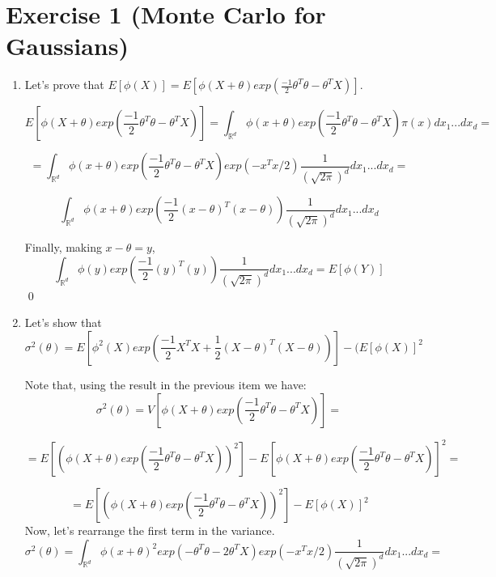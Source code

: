 \documentclass[12pt,letterpaper]{article}
\begin{document}

\section*{Exercise 1 (Monte Carlo for Gaussians)}
\begin{enumerate}[leftmargin=!,labelindent=5pt]
	\item Let's prove that $E[\phi(X)] = E[\phi(X+\theta)
	exp(\frac{-1}{2}\theta^T\theta - \theta^T X)]$.

	$$ E[\phi(X+\theta)exp(\frac{-1}{2}\theta^T\theta - \theta^T X)]
	= \int_{\mathbb{R}^d} \phi(x+\theta) exp(\frac{-1}{2}\theta^T
	\theta - \theta^T X)\pi(x)dx_1...dx_d = $$

	$$ =  \int_{\mathbb{R}^d} \phi(x+\theta) exp\left(\frac{-1}{2}
	\theta^T
	\theta - \theta^T X \right)exp(-x^T x / 2)\frac{1}{(\sqrt{2\pi})^d}
	dx_1...dx_d = $$

	$$ \int_{\mathbb{R}^d} \phi(x+\theta) exp\left(\frac{-1}{2}
	(x-\theta)^T(x-\theta)\right)\frac{1}{(\sqrt{2\pi})^d}
	dx_1...dx_d$$

	Finally, making $x-\theta = y$,
	$$ \int_{\mathbb{R}^d} \phi(y) exp\left(\frac{-1}{2}
	(y)^T(y)\right)\frac{1}{(\sqrt{2\pi})^d}
	dx_1...dx_d = E[\phi(Y)] $$
	\qed


	\item Let's show that
	$$ \sigma^2(\theta) = E\left[ 
	\phi^2(X) exp\left(
		\frac{-1}{2}X^T X + \frac{1}{2}(X - \theta)^T(X - \theta)
		\right)
	\right] - (E[\phi(X)]^2$$

	Note that, using the result in the previous item we have:
	$$ \sigma^2(\theta) = V\left[
	\phi(X + \theta)exp\left(
		\frac{-1}{2}\theta^T \theta - \theta^T X
		\right)
	\right] = $$

	$$
	= E \left[ \left(
	\phi(X + \theta)exp\left(
		\frac{-1}{2}\theta^T \theta - \theta^T X
		\right) \right ) ^ 2
	\right] -
	E \left[
	\phi(X + \theta)exp\left(
		\frac{-1}{2}\theta^T \theta - \theta^T X
		\right)
	\right] ^2  = 
	$$

	$$
	= E \left[ \left(
	\phi(X + \theta)exp\left(
		\frac{-1}{2}\theta^T \theta - \theta^T X
		\right) \right ) ^ 2
	\right] -
	E \left[ \phi(X)
	\right] ^2
	$$
	Now, let's rearrange the first term in the variance.
	$$ \sigma^2(\theta) = 
	\int_{\mathbb{R}^d} \phi(x+\theta)^2 exp\left(
	 - \theta^T
	\theta - 2\theta^T X \right)exp(-x^T x / 2)\frac{1}{(\sqrt{2\pi})^d}
	dx_1...dx_d = $$


\end{enumerate}
\end{document}
